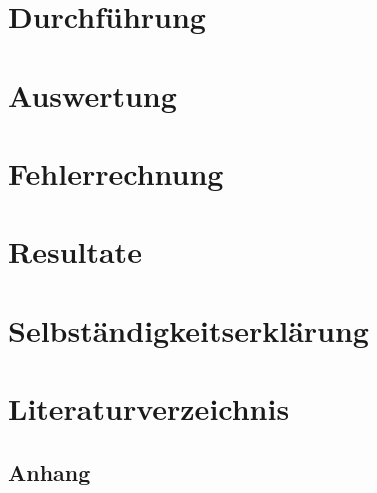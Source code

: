 \documentclass[10pt,a4paper,oneside]{article}
\begin{document}
\section{Durchführung}\label{sec:durchführung}

\clearpage

\section{Auswertung}\label{sec:auswertung}

\clearpage

\section{Fehlerrechnung}\label{sec:fehlerrechnung}

\clearpage

\section{Resultate}\label{sec:resultate}

\clearpage

\section{Selbständigkeitserklärung}\label{sec:selbständigkeitserklärung}

\clearpage

\section{Literaturverzeichnis}\label{sec:bibliography}

\clearpage

\begin{appendix}
\section{Anhang}\label{sec:appendix}

\end{appendix}
\end{document}
